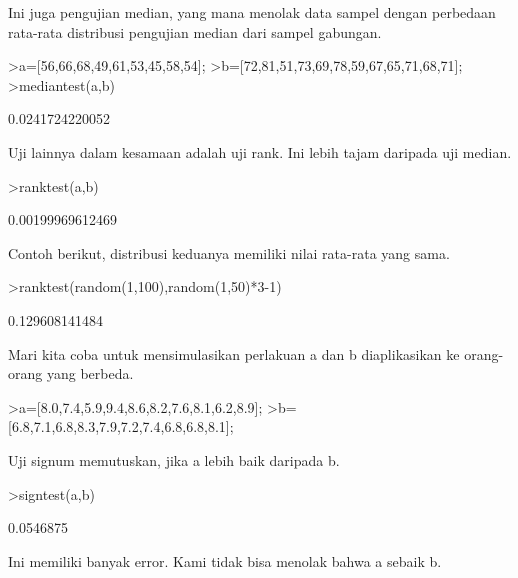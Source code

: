 \documentclass[a4paper,10pt]{article}
\begin{document}
\begin{eulernotebook}
\begin{eulercomment}
\begin{eulercomment}
\begin{eulercomment}
Ini juga pengujian median, yang mana menolak data sampel dengan
perbedaan rata-rata distribusi pengujian median dari sampel gabungan.
\end{eulercomment}
\begin{eulerprompt}
>a=[56,66,68,49,61,53,45,58,54];
>b=[72,81,51,73,69,78,59,67,65,71,68,71];
>mediantest(a,b)
\end{eulerprompt}
\begin{euleroutput}
  0.0241724220052
\end{euleroutput}
\begin{eulercomment}
Uji lainnya dalam kesamaan adalah uji rank. Ini lebih tajam daripada
uji median.
\end{eulercomment}
\begin{eulerprompt}
>ranktest(a,b)
\end{eulerprompt}
\begin{euleroutput}
  0.00199969612469
\end{euleroutput}
\begin{eulercomment}
Contoh berikut, distribusi keduanya memiliki nilai rata-rata yang
sama.
\end{eulercomment}
\begin{eulerprompt}
>ranktest(random(1,100),random(1,50)*3-1)
\end{eulerprompt}
\begin{euleroutput}
  0.129608141484
\end{euleroutput}
\begin{eulercomment}
Mari kita coba untuk mensimulasikan perlakuan a dan b diaplikasikan ke
orang-orang yang berbeda.
\end{eulercomment}
\begin{eulerprompt}
>a=[8.0,7.4,5.9,9.4,8.6,8.2,7.6,8.1,6.2,8.9];
>b=[6.8,7.1,6.8,8.3,7.9,7.2,7.4,6.8,6.8,8.1];
\end{eulerprompt}
\begin{eulercomment}
Uji signum memutuskan, jika a lebih baik daripada b.
\end{eulercomment}
\begin{eulerprompt}
>signtest(a,b)
\end{eulerprompt}
\begin{euleroutput}
  0.0546875
\end{euleroutput}
\begin{eulercomment}
Ini memiliki banyak error. Kami tidak bisa menolak bahwa a sebaik b.


\end{eulercomment}
\end{eulercomment}
\end{eulercomment}
\end{eulernotebook}
\end{document}
